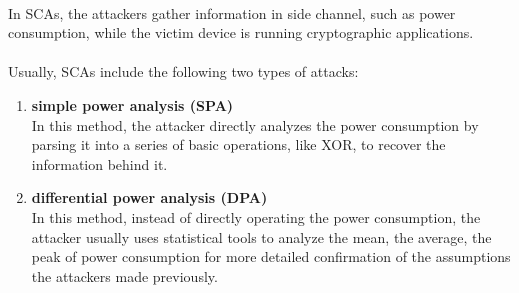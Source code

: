 \paragraph{}In SCAs, the attackers gather information in side channel, such as power consumption, while the victim device is running cryptographic applications.
\paragraph{} Usually, SCAs include the following two types of attacks:
\begin{enumerate}
    \item \textbf{simple power analysis (SPA)}\\
    In this method, the attacker directly analyzes the power consumption by parsing it into a series of basic operations, like XOR, to recover the information behind it.
    \item \textbf{differential power analysis (DPA)}\\
    In this method, instead of directly operating the power consumption, the attacker usually uses statistical tools to analyze the mean, the average, the peak of power consumption for more detailed confirmation of the assumptions the attackers made previously.
\end{enumerate}
